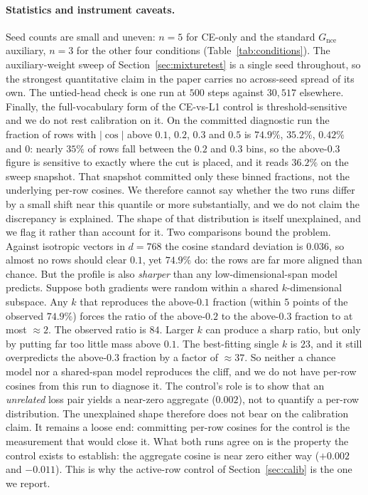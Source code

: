 \paragraph{Statistics and instrument caveats.} Seed counts are small and uneven: $n{=}5$ for CE-only and the standard $G_{\text{nce}}$ auxiliary, $n{=}3$ for the other four conditions (Table~\ref{tab:conditions}). The auxiliary-weight sweep of Section~\ref{sec:mixturetest} is a single seed throughout, so the strongest quantitative claim in the paper carries no across-seed spread of its own. The untied-head check is one run at $500$ steps
against $30{,}517$ elsewhere. Finally, the full-vocabulary form of the CE-vs-L1
control is threshold-sensitive and we do not rest calibration on it. On the
committed diagnostic run the fraction of rows with $|\cos|$ above $0.1$, $0.2$,
$0.3$ and $0.5$ is $74.9\%$, $35.2\%$, $0.42\%$ and $0$: nearly $35\%$ of
rows fall between the $0.2$ and $0.3$ bins, so the above-$0.3$ figure is
sensitive to exactly where the cut is placed, and it reads $36.2\%$ on the sweep
snapshot. That snapshot committed only these binned fractions, not the underlying per-row cosines. We therefore cannot say whether the two runs differ by a small shift near this quantile or more substantially, and we do not claim the discrepancy is explained. The shape of that distribution is itself unexplained, and we flag it rather than
account for it. Two comparisons bound the problem. Against isotropic vectors in
$d{=}768$ the cosine standard deviation is $0.036$, so almost no rows should clear
$0.1$, yet $74.9\%$ do: the rows are far more aligned than chance. But the profile is
also \emph{sharper} than any low-dimensional-span model predicts. Suppose both gradients were random within a shared
$k$-dimensional subspace. Any $k$ that reproduces the
above-$0.1$ fraction (within $5$ points of the observed $74.9\%$) forces the ratio of
the above-$0.2$ to the above-$0.3$ fraction to at most ${\approx}2$. The observed
ratio is $84$. Larger $k$ can produce a sharp ratio, but only by putting far too
little mass above $0.1$. The
best-fitting single $k$ is $23$, and it still overpredicts the above-$0.3$ fraction by
a factor of ${\approx}37$. So neither a chance model nor a shared-span model
reproduces the cliff, and we do not have per-row cosines from this run to diagnose it.
The control's role is to show that an \emph{unrelated} loss pair yields a near-zero
aggregate ($0.002$), not to quantify a per-row distribution. The unexplained shape
therefore does not bear on the calibration claim. It remains a loose end: committing
per-row cosines for the control is the measurement that would close it. What both runs agree on is the property the control
exists to establish: the aggregate cosine is near zero either way ($+0.002$ and
$-0.011$). This is why the active-row control of Section~\ref{sec:calib} is the
one we report.

